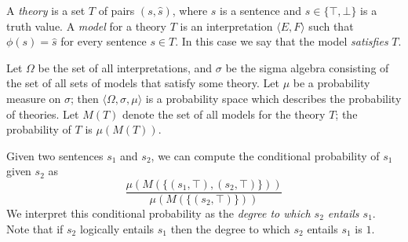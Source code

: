 \documentclass[letterpaper]{article}
\begin{document}
A \emph{theory} is a set $T$ of pairs $(s,\hat{s})$, where $s$ is a
sentence and $\hat{s}\in\{\top,\bot\}$ is a truth value. A
\emph{model} for a theory $T$ is an interpretation $\langle E,
F\rangle$ such that $\phi(s) = \hat{s}$ for every sentence $s\in
T$. In this case we say that the model \emph{satisfies} $T$.

Let $\Omega$ be the set of all interpretations, and $\sigma$ be the
sigma algebra consisting of the set of all sets of models that satisfy
some theory. Let $\mu$ be a probability measure on $\sigma$; then
$\langle\Omega,\sigma,\mu\rangle$ is a probability space which
describes the probability of theories. Let $M(T)$ denote the set of
all models for the theory $T$; the probability of $T$ is $\mu(M(T))$.


Given two sentences $s_1$ and $s_2$, we can compute the conditional
probability of $s_1$ given $s_2$ as
$$\frac{\mu(M(\{(s_1, \top), (s_2, \top)\}))}{\mu(M(\{(s_2,\top)\}))}$$
We interpret this conditional probability as the {\em degree to which $s_2$ entails $s_1$\/}. Note that if $s_2$ logically entails $s_1$ then the degree to which  $s_2$ entails $s_1$ is $1$.

\end{document}
